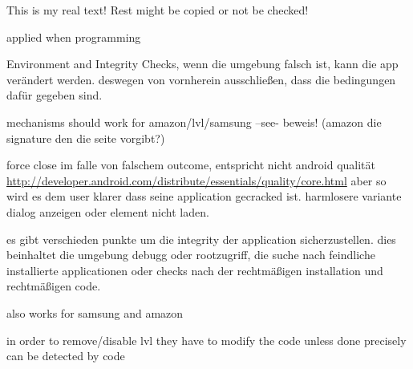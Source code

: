 This is my real text! Rest might be copied or not be checked!

applied when programming

Environment and Integrity Checks, wenn die umgebung falsch ist, kann die app verändert werden. deswegen von vornherein ausschließen, dass die bedingungen dafür gegeben sind.
\cite{munteanLicense}

mechanisms should work for amazon/lvl/samsung --see- beweis! (amazon die signature den die seite vorgibt?)

force close im falle von falschem outcome, entspricht nicht android qualität
\url{http://developer.android.com/distribute/essentials/quality/core.html} aber so wird es dem user klarer dass seine application gecracked ist. harmlosere variante dialog anzeigen oder element nicht laden.

es gibt verschieden punkte um die integrity der application sicherzustellen. dies beinhaltet die umgebung debugg oder rootzugriff, die suche nach feindliche installierte applicationen oder checks nach der rechtmäßigen installation und rechtmäßigen code.

also works for samsung and amazon

%
in order to remove/disable lvl they have to modify the code
unless done precisely can be detected by code
\cite{developersSecuring}
%
